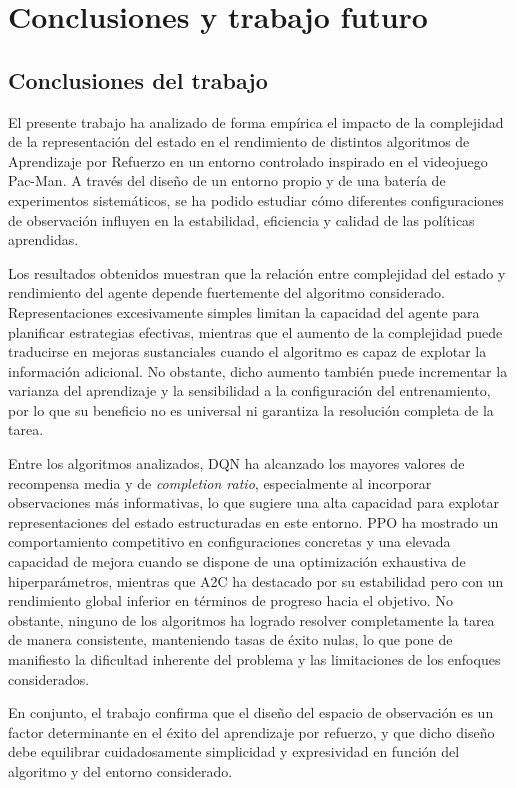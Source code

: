 \chapter{Conclusiones y trabajo futuro}

\section{Conclusiones del trabajo}

El presente trabajo ha analizado de forma empírica el impacto de la complejidad de la representación del estado en el rendimiento de distintos algoritmos de Aprendizaje por Refuerzo en un entorno controlado inspirado en el videojuego Pac-Man. A través del diseño de un entorno propio y de una batería de experimentos sistemáticos, se ha podido estudiar cómo diferentes configuraciones de observación influyen en la estabilidad, eficiencia y calidad de las políticas aprendidas.

Los resultados obtenidos muestran que la relación entre complejidad del estado y rendimiento del agente depende fuertemente del algoritmo considerado. Representaciones excesivamente simples limitan la capacidad del agente para planificar estrategias efectivas, mientras que el aumento de la complejidad puede traducirse en mejoras sustanciales cuando el algoritmo es capaz de explotar la información adicional. No obstante, dicho aumento también puede incrementar la varianza del aprendizaje y la sensibilidad a la configuración del entrenamiento, por lo que su beneficio no es universal ni garantiza la resolución completa de la tarea.

Entre los algoritmos analizados, DQN ha alcanzado los mayores valores de recompensa media y de \textit{completion ratio}, especialmente al incorporar observaciones más informativas, lo que sugiere una alta capacidad para explotar representaciones del estado estructuradas en este entorno. PPO ha mostrado un comportamiento competitivo en configuraciones concretas y una elevada capacidad de mejora cuando se dispone de una optimización exhaustiva de hiperparámetros, mientras que A2C ha destacado por su estabilidad pero con un rendimiento global inferior en términos de progreso hacia el objetivo. No obstante, ninguno de los algoritmos ha logrado resolver completamente la tarea de manera consistente, manteniendo tasas de éxito nulas, lo que pone de manifiesto la dificultad inherente del problema y las limitaciones de los enfoques considerados.

En conjunto, el trabajo confirma que el diseño del espacio de observación es un factor determinante en el éxito del aprendizaje por refuerzo, y que dicho diseño debe equilibrar cuidadosamente simplicidad y expresividad en función del algoritmo y del entorno considerado.

